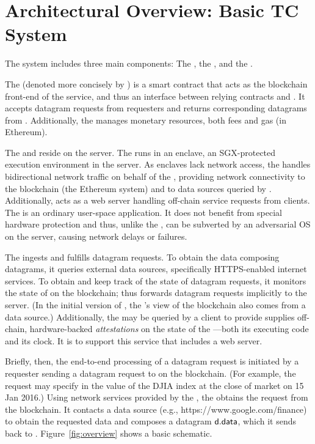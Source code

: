 \section{Architectural Overview: Basic TC System}

The \tcs system includes three main components: The \tcontract, the \encname, and the \medname.

The \tcontract (denoted more concisely by \tcont) is a smart contract that acts as the blockchain front-end of the \tc service, and thus an interface between relying contracts and \tc. It accepts datagram requests from requesters and returns corresponding datagrams from \tc. Additionally, the \tcontract manages \tc monetary resources, both fees and gas (in Ethereum). 

The \encname and \medname reside on the \tc server. The \encname runs in an enclave, an SGX-protected execution environment in the server. As enclaves lack network access, the \medname handles bidirectional network traffic on behalf of the \encname, providing network connectivity to the blockchain (the Ethereum system) and to data sources queried by \encname. Additionally, \medname acts as a web server handling off-chain service requests from clients. The \medname is an ordinary user-space application. It does not benefit from special hardware protection and thus, unlike the \encname, can be subverted by an adversarial OS on the \tc server, causing network delays or failures.

The \encname ingests and fulfills datagram requests. To obtain the data composing datagrams, it queries external data sources, specifically HTTPS-enabled internet services. To obtain and keep track of the state of datagram requests, it monitors the state of \tcontract on the blockchain; thus \tcontract forwards datagram requests implicitly to the \tc server. (In the initial version of \tcontract, the \encname's view of the blockchain also comes from a data source.) Additionally, the \encname may be queried by a client to provide supplies off-chain, hardware-backed \emph{attestations} on the state of the \encname---both its executing code and its clock. It is to support this service that \medname includes a web server.

Briefly, then, the end-to-end processing of a datagram request is initiated by a requester \reqcont sending a datagram request to \tcont on the blockchain. (For example, the request may specify in \dgform the value of the DJIA index at the close of market on 15 Jan 2016.) Using network services provided by the \medname, the \encname obtains the request from the blockchain. It contacts a data source (e.g., https://www.google.com/finance) to obtain the requested data and composes a datagram ${\sf d.data}$, which it sends back to \reqcont. Figure~\ref{fig:overview} shows a basic schematic.

